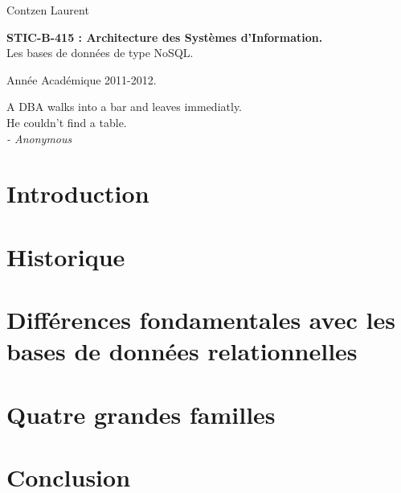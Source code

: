 \documentclass[11pt]{article}
\author{Contzen Laurent}
\begin{document}
\begin{titlepage}  
  \begin{flushleft}
    Contzen Laurent
  \end{flushleft}
  \begin{center}
    \vspace{85mm}\LARGE{\textbf{STIC-B-415 : Architecture des Systèmes d'Information.} \\    
      Les bases de données de type NoSQL.}
  \end{center}
  \begin{flushright}
    \vspace{95mm}
    Année Académique 2011-2012.             
  \end{flushright}
\end{titlepage}

\tableofcontents
\newpage
\vspace*{\fill}
\begin{flushright}
  A DBA walks into a bar and leaves immediatly. \\
  He couldn't find a table. \\
  \textit{- Anonymous}
\end{flushright}
\vspace*{\fill}
\newpage

\section{Introduction}

\section{Historique}

\section{Différences fondamentales avec les bases de données relationnelles}

\section{Quatre grandes familles}

\section{Conclusion}
\end{document}
